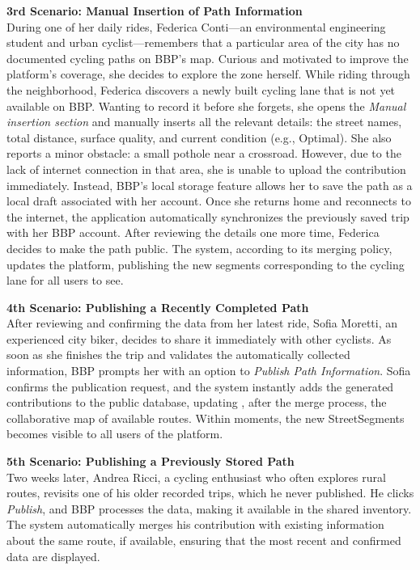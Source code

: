 \item \textbf{3rd Scenario: Manual Insertion of Path Information}\\
During one of her daily rides, Federica Conti—an environmental engineering student and urban cyclist—remembers that a particular area of the city has no documented cycling paths on BBP’s map. Curious and motivated to improve the platform’s coverage, she decides to explore the zone herself.
While riding through the neighborhood, Federica discovers a newly built cycling lane that is not yet available on BBP. Wanting to record it before she forgets, she opens the \textit{Manual insertion section} and manually inserts all the relevant details: the street names, total distance, surface quality, and current condition (e.g., Optimal). She also reports a minor obstacle: a small pothole near a crossroad.
However, due to the lack of internet connection in that area, she is unable to upload the contribution immediately. Instead, BBP’s local storage feature allows her to save the path as a local draft associated with her account.
Once she returns home and reconnects to the internet, the application automatically synchronizes the previously saved trip with her BBP account. After reviewing the details one more time, Federica decides to make the path public. The system, according to its merging policy, updates the platform, publishing the new segments corresponding to the cycling lane for all users to see.


\item \textbf{4th Scenario: Publishing a Recently Completed Path}\\
After reviewing and confirming the data from her latest ride, Sofia Moretti, an experienced city biker, decides to share it immediately with other cyclists. 
As soon as she finishes the trip and validates the automatically collected information, BBP prompts her with an option to \textit{Publish Path Information}. 
Sofia confirms the publication request, and the system instantly adds the generated contributions to the public database, updating , after the merge process, the collaborative map of available routes. 
Within moments, the new StreetSegments becomes visible to all users of the platform.

\item \textbf{5th Scenario: Publishing a Previously Stored Path}\\
Two weeks later, Andrea Ricci, a cycling enthusiast who often explores rural routes, revisits one of his older recorded trips, which he never published.
He clicks \textit{Publish}, and BBP processes the data, making it available in the shared inventory. The system automatically merges his contribution with existing information about the same route, if available, ensuring that the most recent and confirmed data are displayed.

